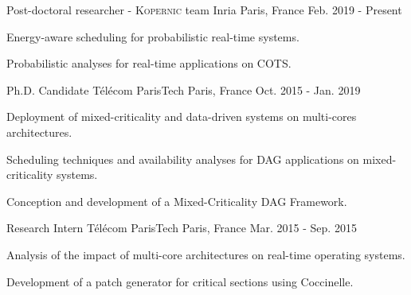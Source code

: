 


\begin{cventries}


\cventry
{Post-doctoral researcher - \textsc{Kopernic} team} %
{Inria} %
{Paris, France} %
{Feb. 2019 - Present} %
{ %
\begin{cvitems}
\item {Energy-aware scheduling for probabilistic real-time systems.}
\item{Probabilistic analyses for real-time applications on COTS.}
\end{cvitems}
}


\cventry
{Ph.D. Candidate} %
{Télécom ParisTech} %
{Paris, France} %
{Oct. 2015 - Jan. 2019} %
{ %
\begin{cvitems}
\item {Deployment of mixed-criticality and data-driven systems on multi-cores 
architectures.}
\item {Scheduling techniques and availability analyses for DAG applications on 
mixed-criticality systems.}
\item {Conception and development of a Mixed-Criticality DAG Framework.}
\end{cvitems}
}


\cventry
{Research Intern} %
{Télécom ParisTech} %
{Paris, France} %
{Mar. 2015 - Sep. 2015} %
{ %
\begin{cvitems}
\item {Analysis of the impact of multi-core architectures on real-time 
operating systems.}
\item {Development of a patch generator for critical sections using Coccinelle.}
\end{cvitems} 
}


\end{cventries}
